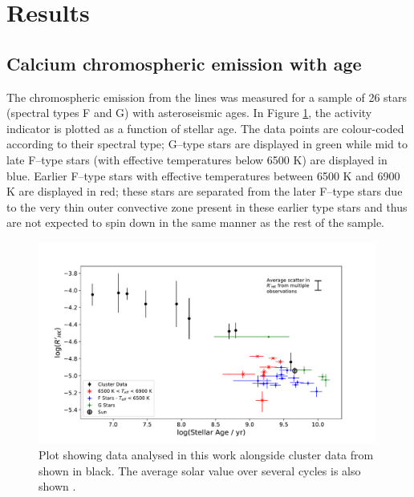 \section{Results}
\label{Chp4_results}

\subsection{Calcium chromospheric emission with age}
\label{Chp4_results_general_results}
The chromospheric emission from the \caII lines was measured for a sample of 26 stars (spectral types F and G) with asteroseismic ages. In Figure \ref{fig:calcium_emission_plot}, the \Rprime activity indicator is plotted as a function of stellar age. The data points are colour-coded according to their spectral type; G--type stars are displayed in green while mid to late F--type stars (with effective temperatures below 6500 K) are displayed in blue. Earlier F--type stars with effective temperatures between 6500 K and 6900 K are displayed in red; these stars are separated from the later F--type stars due to the very thin outer convective zone present in these earlier type stars and thus are not expected to spin down in the same manner as the rest of the sample.

\begin{figure}[h]
	\includegraphics[width=0.99\textwidth]{Figures/4-Chromospheric_age/ca_results_with_clusters.pdf}
	\caption[Calcium emission as a function of age for sample and cluster data]{Plot showing data analysed in this work alongside cluster data from \citet{Mamajek_Hillenbrand_2008} shown in black. The average solar value over several cycles is also shown \citep{Egeland_etal_2017}.}
	\centering
	\label{fig:calcium_emission_plot}
\end{figure}

